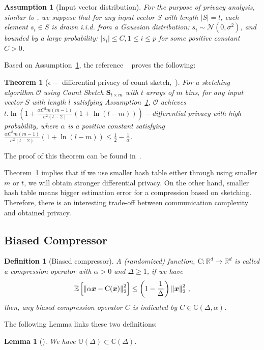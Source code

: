 \documentclass[twoside]{article}
\newtheorem{theorem}{Theorem}
\newtheorem{lemma}{Lemma}
\newtheorem{assumption}{Assumption}
\newtheorem{definition}{Definition}
\begin{document}
\begin{assumption}[Input vector distribution]\label{assu:invecdist}
For the purpose of privacy analysis, similar to \cite{fergus2006removing,gong2014gradient,levin2007image,parmas2018total}, we suppose that for any input vector $S$ with length $|S|=l$, each element $s_i\in S$ is drawn i.i.d. from a Gaussian distribution: $s_i\sim \mathcal{N}(0,\sigma^2)$, and bounded by a large probability:  $|s_i|\leq C, 1\leq i\leq p$ for some positive constant $C>0$.    
\end{assumption}

Based on Assumption~\ref{assu:invecdist}, the reference ~\cite{li2019privacy} proves the following:

\begin{theorem}[$\epsilon-$ differential privacy of count sketch,~\cite{li2019privacy}]\label{thm:privacy}
For a sketching algorithm $\mathcal{O}$ using Count Sketch $\mathbf{S}_{t\times m}$ with $t$ arrays of $m$ bins, for any input vector $S$ with length $l$ satisfying Assumption~\ref{assu:invecdist}, $\mathcal{O}$ achieves $t.\ln \left(1+\frac{\alpha C^2 m(m-1)}{\sigma^2(l-2)}(1+\ln(l-m) )\right)-$differential privacy with high probability, where $\alpha$ is a positive constant satisfying $\frac{\alpha C^2 m(m-1)}{\sigma^2(l-2)}(1+\ln(l-m) )\leq \frac{1}{2}-\frac{1}{\alpha}$.
\end{theorem}
The proof of this theorem can be found in~\cite{li2019privacy}.

Theorem~\ref{thm:privacy} implies that if we use smaller hash table either through using smaller $m$ or $t$, we will obtain stronger differential privacy. On the other hand, smaller hash table means bigger estimation error for a compression based on sketching. Therefore, there is an interesting trade-off between communication complexity and obtained privacy.




\subsection{Biased Compressor}
\begin{definition}[Biased compressor]
A (randomized) function,  ${\text{C}}:\mathbb{R}^{d}\rightarrow\mathbb{R}^{d}$ is called a compression operator with $\alpha>0$ and $\Delta\geq 1$, if we have 
\begin{align}\notag
    \mathbb{E}\left[\left\|\alpha\boldsymbol{x}-{\text{C}}(\boldsymbol{x})\right\|^2_2\right]\leq \left(1-\frac{1}{\Delta}\right)\left\|\boldsymbol{x}\right\|^2_2\, ,
\end{align}
then, any biased compression operator $C$ is indicated by $C\in \mathbb{C}(\Delta,\alpha)$. 
\end{definition}
The following Lemma links these two definitions:
\begin{lemma}[\cite{horvath2020better}]
We have $\mathbb{U}(\Delta)\subset\mathbb{C}(\Delta)$.
\end{lemma}
\end{document}
